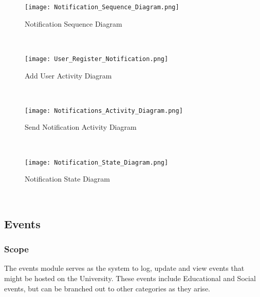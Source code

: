 \documentclass{article}
\begin{document}
    
    \begin{figure}[h!]
        \texttt{[image: Notification\_Sequence\_Diagram.png]} \caption{Notification Sequence Diagram}
    \end{figure}
  
    
    \mbox{}\\
    \bigskip
    
    
    \begin{figure}[h!]
        \texttt{[image: User\_Register\_Notification.png]} \caption{Add User Activity Diagram}
    \end{figure}
    
    
    \mbox{}\\
    \bigskip
    
    \begin{figure}[h!]
        \texttt{[image: Notifications\_Activity\_Diagram.png]} \caption{Send Notification Activity Diagram}
    \end{figure}
    
    
    \mbox{}\\
    \bigskip
    \clearpage
    
    \begin{figure}[h!]
        \begin{center}
            \texttt{[image: Notification\_State\_Diagram.png]} \caption{Notification State Diagram}
        \end{center}
    \end{figure}
    
    \mbox{}\\
    \bigskip
    \newpage
    
\subsection{Events}
\subsubsection{Scope}
    The events module serves as the system to log, update and view events that might be hosted on the University. These events include Educational and Social events, but can be branched out to other categories as they arise.
    
\end{document}
